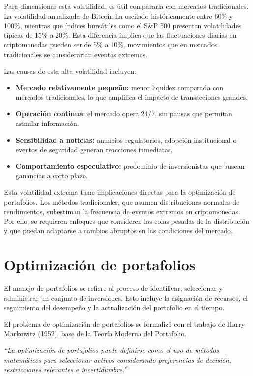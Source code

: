 \documentclass[12pt]{article}
\begin{document}
Para dimensionar esta volatilidad, es útil compararla con mercados
tradicionales. La volatilidad anualizada de Bitcoin ha oscilado
históricamente entre 60\% y 100\%, mientras que índices bursátiles
como el S\&P 500 presentan volatilidades típicas de 15\% a 20\%. Esta
diferencia implica que las fluctuaciones diarias en criptomonedas
pueden ser de 5\% a 10\%, movimientos que en mercados tradicionales
se considerarían eventos extremos.

Las causas de esta alta volatilidad incluyen:

\begin{itemize}
  \item \textbf{Mercado relativamente pequeño:} menor liquidez
    comparada con mercados tradicionales, lo que amplifica el impacto
    de transacciones grandes.
  \item \textbf{Operación continua:} el mercado opera 24/7, sin
    pausas que permitan asimilar información.
  \item \textbf{Sensibilidad a noticias:} anuncios regulatorios,
    adopción institucional o eventos de seguridad generan
    reacciones inmediatas.
  \item \textbf{Comportamiento especulativo:} predominio de
    inversionistas que buscan ganancias a corto plazo.
\end{itemize}

Esta volatilidad extrema tiene implicaciones directas para la
optimización de portafolios. Los métodos tradicionales, que asumen
distribuciones normales de rendimientos, subestiman la frecuencia de
eventos extremos en criptomonedas. Por ello, se requieren enfoques
que consideren las colas pesadas de la distribución y que puedan
adaptarse a cambios abruptos en las condiciones del mercado.

\section{Optimización de portafolios}

El manejo de portafolios se refiere al proceso de identificar,
seleccionar y administrar un conjunto de inversiones. Esto incluye la
asignación de recursos, el seguimiento del desempeño y la
actualización del portafolio en el tiempo.

El problema de optimización de portafolios se formalizó con el trabajo
de Harry Markowitz (1952), base de la Teoría Moderna del Portafolio.

\begin{center}
  \itshape
  ``La optimización de portafolios puede definirse como el uso de
  métodos matemáticos para seleccionar activos considerando
  preferencias de decisión, restricciones relevantes e incertidumbre.''
\end{center}
\end{document}
